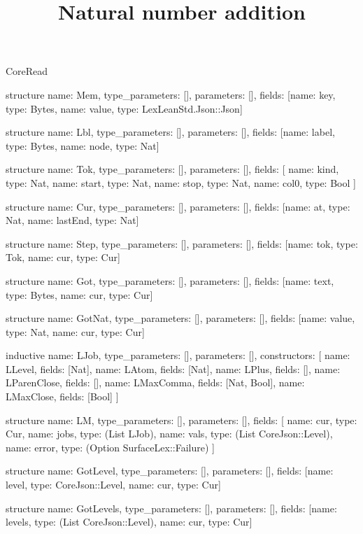 \begin{lexlean}{CoreRead}
\title{Natural number addition}
\begin{semanticmodule}
structure{
  name: Mem,
  type_parameters: [],
  parameters: [],
  fields: [{name: key, type: Bytes}, {name: value, type: LexLeanStd.Json::Json}]
}

structure{
  name: Lbl,
  type_parameters: [],
  parameters: [],
  fields: [{name: label, type: Bytes}, {name: node, type: Nat}]
}

structure{
  name: Tok,
  type_parameters: [],
  parameters: [],
  fields: [
    {name: kind, type: Nat},
    {name: start, type: Nat},
    {name: stop, type: Nat},
    {name: col0, type: Bool}
  ]
}

structure{
  name: Cur,
  type_parameters: [],
  parameters: [],
  fields: [{name: at, type: Nat}, {name: lastEnd, type: Nat}]
}

structure{
  name: Step,
  type_parameters: [],
  parameters: [],
  fields: [{name: tok, type: Tok}, {name: cur, type: Cur}]
}

structure{
  name: Got,
  type_parameters: [],
  parameters: [],
  fields: [{name: text, type: Bytes}, {name: cur, type: Cur}]
}

structure{
  name: GotNat,
  type_parameters: [],
  parameters: [],
  fields: [{name: value, type: Nat}, {name: cur, type: Cur}]
}

inductive{
  name: LJob,
  type_parameters: [],
  parameters: [],
  constructors: [
    {name: LLevel, fields: [Nat]},
    {name: LAtom, fields: [Nat]},
    {name: LPlus, fields: []},
    {name: LParenClose, fields: []},
    {name: LMaxComma, fields: [Nat, Bool]},
    {name: LMaxClose, fields: [Bool]}
  ]
}

structure{
  name: LM,
  type_parameters: [],
  parameters: [],
  fields: [
    {name: cur, type: Cur},
    {name: jobs, type: (List LJob)},
    {name: vals, type: (List CoreJson::Level)},
    {name: error, type: (Option SurfaceLex::Failure)}
  ]
}

structure{
  name: GotLevel,
  type_parameters: [],
  parameters: [],
  fields: [{name: level, type: CoreJson::Level}, {name: cur, type: Cur}]
}

structure{
  name: GotLevels,
  type_parameters: [],
  parameters: [],
  fields: [{name: levels, type: (List CoreJson::Level)}, {name: cur, type: Cur}]
}


\end{semanticmodule}
\end{lexlean}
